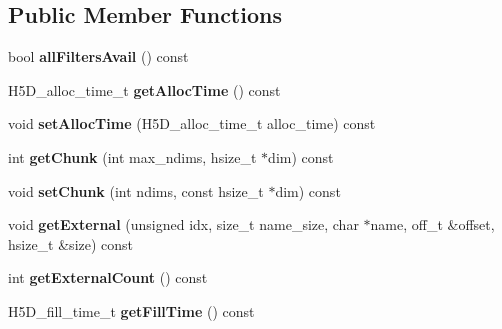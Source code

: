 \subsection*{Public Member Functions}
\begin{DoxyCompactItemize}
\item 
\mbox{\label{class_h5_1_1_d_set_creat_prop_list_a1025d1da39a94d45f6517871617ebec9}} 
bool {\bfseries all\+Filters\+Avail} () const
\item 
\mbox{\label{class_h5_1_1_d_set_creat_prop_list_a50afbd767f718afaf4d047daaad60d22}} 
H5\+D\+\_\+alloc\+\_\+time\+\_\+t {\bfseries get\+Alloc\+Time} () const
\item 
\mbox{\label{class_h5_1_1_d_set_creat_prop_list_a7d28e947173c3449061f162a24c77713}} 
void {\bfseries set\+Alloc\+Time} (H5\+D\+\_\+alloc\+\_\+time\+\_\+t alloc\+\_\+time) const
\item 
\mbox{\label{class_h5_1_1_d_set_creat_prop_list_a0548525ce9a6ca046a1e29143597b5e3}} 
int {\bfseries get\+Chunk} (int max\+\_\+ndims, hsize\+\_\+t $\ast$dim) const
\item 
\mbox{\label{class_h5_1_1_d_set_creat_prop_list_ad6ef1bf35feae7e5c08f4ea734b6db38}} 
void {\bfseries set\+Chunk} (int ndims, const hsize\+\_\+t $\ast$dim) const
\item 
\mbox{\label{class_h5_1_1_d_set_creat_prop_list_ad459cacb6070efad38715eca9384902a}} 
void {\bfseries get\+External} (unsigned idx, size\+\_\+t name\+\_\+size, char $\ast$name, off\+\_\+t \&offset, hsize\+\_\+t \&size) const
\item 
\mbox{\label{class_h5_1_1_d_set_creat_prop_list_ac7c9d55d726c724b7b8484f9ab6e2f52}} 
int {\bfseries get\+External\+Count} () const
\item 
\mbox{\label{class_h5_1_1_d_set_creat_prop_list_a1028d3865cb6eaee54a53fcc6fffffe7}} 
H5\+D\+\_\+fill\+\_\+time\+\_\+t {\bfseries get\+Fill\+Time} () const
\item 

\end{DoxyCompactItemize}

